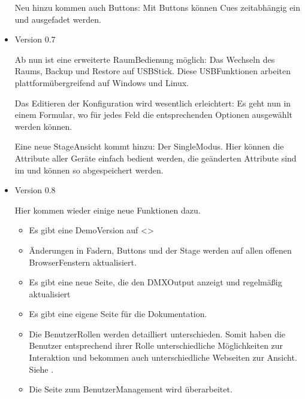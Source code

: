 \documentclass[letterpaper,10pt,ngerman]{sphinxmanual}
\begin{document}
\begin{itemize}
Neu hinzu kommen auch Buttons: Mit Buttons können Cues zeitabhängig
ein\sphinxhyphen{} und ausgefadet werden.

\item {} 
Version 0.7

Ab nun ist eine erweiterte Raum\sphinxhyphen{}Bedienung möglich: Das Wechseln des
Raums, Backup und Restore auf USB\sphinxhyphen{}Stick. Diese USB\sphinxhyphen{}Funktionen arbeiten
plattformübergreifend auf Windows und Linux.

Das Editieren der Konfiguration wird wesentlich erleichtert: Es geht nun
in einem Formular, wo für jedes Feld die entsprechenden Optionen
ausgewählt werden können.

Eine neue Stage\sphinxhyphen{}Ansicht kommt hinzu: Der Single\sphinxhyphen{}Modus. Hier können die
Attribute aller Geräte einfach bedient werden, die geänderten
Attribute sind im {\hyperref[\detokenize{grundlagen:topcuelabel}]{}} und können so abgespeichert werden.

\item {} 
Version 0.8

Hier kommen wieder einige neue Funktionen dazu.
\begin{itemize}
\item {} 
Es gibt eine Demo\sphinxhyphen{}Version auf \textless{}\textgreater{}

\item {} 
Änderungen in Fadern, Buttons und der Stage werden auf allen
offenen Browser\sphinxhyphen{}Fenstern aktualisiert.

\item {} 
Es gibt eine neue Seite, die den DMX\sphinxhyphen{}Output anzeigt und regelmäßig
aktualisiert

\item {} 
Es gibt eine eigene Seite für die Dokumentation.

\item {} 
Die Benutzer\sphinxhyphen{}Rollen werden detailliert unterschieden. Somit haben die
Benutzer entsprechend ihrer Rolle unterschiedliche Möglichkeiten
zur Interaktion und bekommen auch unterschiedliche Webseiten zur
Ansicht. Siehe {\hyperref[\detokenize{benutzer:benutzer-label}]{}} .

\item {} 
Die Seite zum Benutzer\sphinxhyphen{}Management wird überarbeitet.


\end{itemize}
\end{itemize}
\end{document}
